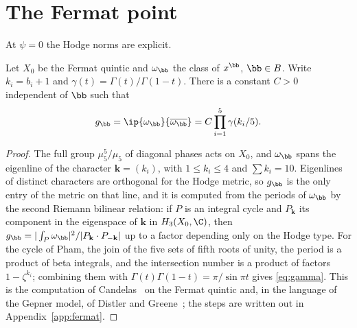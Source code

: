 \section{The Fermat point}\label{sec:fermat}

At $\psi=0$ the Hodge norms are explicit.

\begin{proposition}\label{prop:fermat}
Let $X_0$ be the Fermat quintic and $\omega_{\bb}$ the class of $x^{\bb}$,
$\bb\in B$. Write $k_i=b_i+1$ and $\gamma(t)=\Gamma(t)/\Gamma(1-t)$. There
is a constant $C>0$ independent of $\bb$ such that
\begin{equation}\label{eq:gamma}
g_{\bb}=\ip{\omega_{\bb}}{\overline{\omega_{\bb}}}=C\prod_{i=1}^5
\gamma(k_i/5).
\end{equation}
\end{proposition}

\begin{proof}
The full group $\mu_5^5/\mu_5$ of diagonal phases acts on $X_0$, and
$\omega_{\bb}$ spans the eigenline of the character $\mathbf k=(k_i)$, with
$1\le k_i\le4$ and $\sum k_i=10$. Eigenlines of distinct characters are
orthogonal for the Hodge metric, so $g_{\bb}$ is the only entry of the
metric on that line, and it is computed from the periods of $\omega_{\bb}$
by the second Riemann bilinear relation: if $P$ is an integral cycle and
$P_{\mathbf k}$ its component in the eigenspace of $\mathbf k$ in
$H_3(X_0,\C)$, then $g_{\bb}=|\int_P\omega_{\bb}|^2/
|P_{\mathbf k}\cdot P_{-\mathbf k}|$ up to a factor depending only on the
Hodge type. For the cycle of Pham, the join of the five sets of fifth roots
of unity, the period is a product of beta integrals, and the intersection
number is a product of factors $1-\zeta^{k_i}$; combining them with
$\Gamma(t)\Gamma(1-t)=\pi/\sin\pi t$ gives \eqref{eq:gamma}. This is the
computation of Candelas~\cite{Can88} on the Fermat quintic and, in the
language of the Gepner model, of Distler and Greene~\cite{DG88}; the steps
are written out in Appendix~\ref{app:fermat}.
\end{proof}

